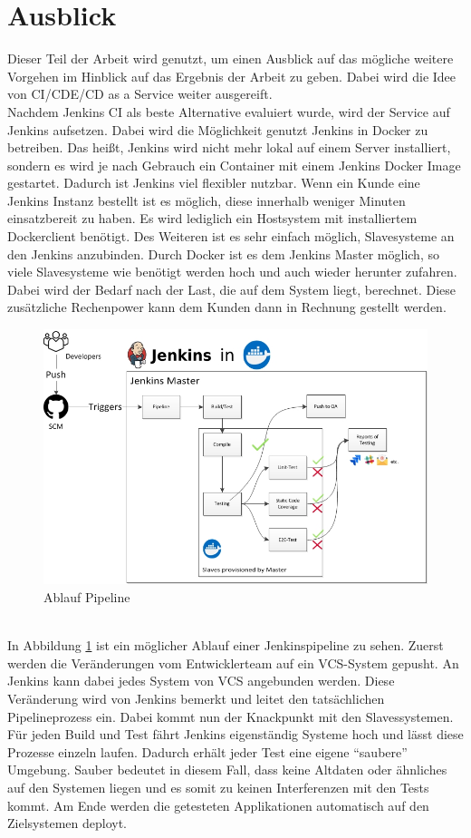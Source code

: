 \section{Ausblick}
Dieser Teil der Arbeit wird genutzt, um einen Ausblick auf das mögliche weitere Vorgehen im Hinblick auf das Ergebnis der Arbeit zu geben. Dabei wird die Idee von \ac{CI}/\ac{CDE}/\ac{CD} as a Service weiter ausgereift.\\
Nachdem Jenkins CI als beste Alternative evaluiert wurde, wird der Service auf Jenkins aufsetzen. Dabei wird die Möglichkeit genutzt Jenkins in Docker zu betreiben. Das heißt, Jenkins wird nicht mehr lokal auf einem Server installiert, sondern es wird je nach Gebrauch ein Container mit einem Jenkins Docker Image gestartet. Dadurch ist Jenkins viel flexibler nutzbar. Wenn ein Kunde eine Jenkins Instanz bestellt ist es möglich, diese innerhalb weniger Minuten einsatzbereit zu haben. Es wird lediglich ein Hostsystem mit installiertem Dockerclient benötigt. Des Weiteren ist es sehr einfach möglich, Slavesysteme an den Jenkins anzubinden. Durch Docker ist es dem Jenkins Master möglich, so viele Slavesysteme wie benötigt werden hoch und auch wieder herunter zufahren. Dabei wird der Bedarf nach der Last, die auf dem System liegt, berechnet. Diese zusätzliche Rechenpower kann dem Kunden dann in Rechnung gestellt werden.
\begin{figure}[h!]
	\centering
	\includegraphics[scale = 0.7]{img/Jenkins.jpg}
	\caption{Ablauf Pipeline}
	\label{img:jenkins}
\end{figure}\\
In Abbildung \ref{img:jenkins} ist ein möglicher Ablauf einer Jenkinspipeline zu sehen. Zuerst werden die Veränderungen vom Entwicklerteam auf ein VCS-System gepusht. An Jenkins kann dabei jedes System von VCS angebunden werden. Diese Veränderung wird von Jenkins bemerkt und leitet den tatsächlichen Pipelineprozess ein. Dabei kommt nun der Knackpunkt mit den Slavessystemen. Für jeden Build und Test fährt Jenkins eigenständig Systeme hoch und lässt diese Prozesse einzeln laufen. Dadurch erhält jeder Test eine eigene \enquote{saubere} Umgebung. Sauber bedeutet in diesem Fall, dass keine Altdaten oder ähnliches auf den Systemen liegen und es somit zu keinen Interferenzen mit den Tests kommt. Am Ende werden die getesteten Applikationen automatisch auf den Zielsystemen deployt.\\
